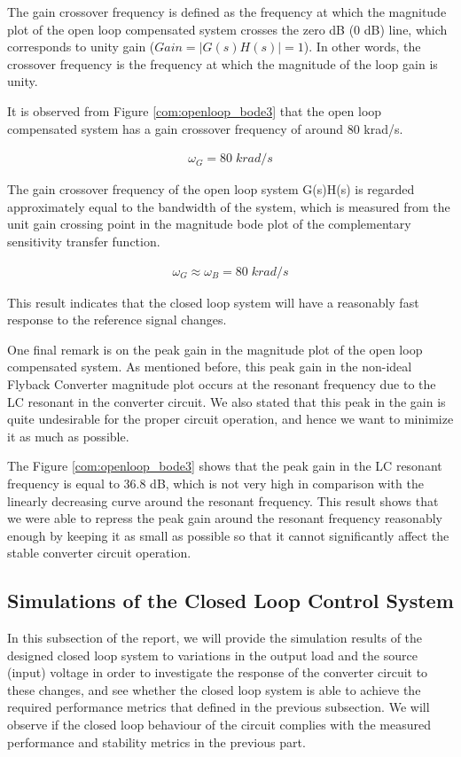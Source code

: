 The gain crossover frequency is defined as the frequency at which the magnitude plot of the open loop compensated system crosses the zero dB (0 dB) line, which corresponds to unity gain ($Gain = |G(s)H(s)| = 1$). In other words, the crossover frequency is the frequency at which the magnitude of the loop gain is unity.

It is observed from Figure \ref{com:openloop_bode3} that the open loop compensated system has a gain crossover frequency of around 80 krad/s.

\begin{align}
    \omega_G = 80\;krad/s
\end{align}

The gain crossover frequency of the open loop system G(s)H(s) is regarded approximately equal to the bandwidth of the system, which is measured from the unit gain crossing point in the magnitude bode plot of the complementary sensitivity transfer function.

\begin{align}
    \omega_G \approx \omega_B = 80\;krad/s
\end{align}

This result indicates that the closed loop system will have a reasonably fast response to the reference signal changes.

One final remark is on the peak gain in the magnitude plot of the open loop compensated system. As mentioned before, this peak gain in the non-ideal Flyback Converter magnitude plot occurs at the resonant frequency due to the LC resonant in the converter circuit. We also stated that this peak in the gain is quite undesirable for the proper circuit operation, and hence we want to minimize it as much as possible. 

The Figure \ref{com:openloop_bode3} shows that the peak gain in the LC resonant frequency is equal to 36.8 dB, which is not very high in comparison with the linearly decreasing curve around the resonant frequency. This result shows that we were able to repress the peak gain around the resonant frequency reasonably enough by keeping it as small as possible so that it cannot significantly affect the stable converter circuit operation.

\subsection{Simulations of the Closed Loop Control System}

In this subsection of the report, we will provide the simulation results of the designed closed loop system to variations in the output load and the source (input) voltage in order to investigate the response of the converter circuit to these changes, and see whether the closed loop system is able to achieve the required performance metrics that defined in the previous subsection. We will observe if the closed loop behaviour of the circuit complies with the measured performance and stability metrics in the previous part.


